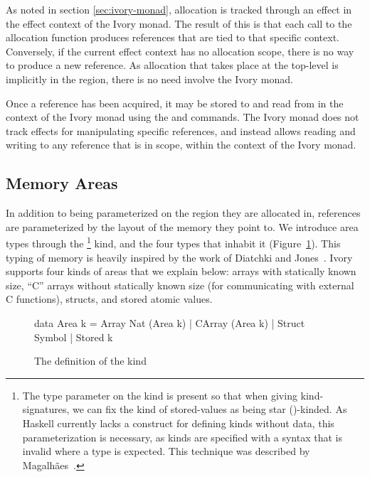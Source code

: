 As noted in section \ref{sec:ivory-monad}, allocation is tracked through an
effect in the effect context of the Ivory monad.  The result of this is that
each call to the  allocation function produces references that are
tied to that specific context.  Conversely, if the current effect context has
no allocation scope, there is no way to produce a new reference.  As allocation
that takes place at the top-level is implicitly in the  region, there
is no need involve the Ivory monad.

Once a reference has been acquired, it may be stored to and read from in the
context of the Ivory monad using the  and  commands.  The
Ivory monad does not track effects for manipulating specific references, and
instead allows reading and writing to any reference that is in scope, within the
context of the Ivory monad.

\subsection{Memory Areas}
\label{sec:area}

In addition to being parameterized on the region they are allocated in,
references are parameterized by the layout of the memory they point to.  We
introduce area types through the  \footnote{ The type parameter on the
 kind is present so that when giving kind-signatures, we can fix the
kind of stored-values as being star (\cd{*})-kinded.  As Haskell currently lacks
a construct for defining kinds without data, this parameterization is necessary,
as kinds are specified with a syntax that is invalid where a type is expected.
This technique was described by Magalh\~{a}es~\cite{jpm:trkgp:12}.} kind, and
the four types that inhabit it (Figure~\ref{fig:area-def}).  This typing of
memory is heavily inspired by the work of Diatchki and Jones~\cite{memareas}.
Ivory supports four kinds of areas that we explain below: arrays with statically
known size, ``C'' arrays without statically known size (for communicating with
external C functions), structs, and stored atomic values.


\begin{figure}[h]
\begin{code}
data Area k = Array Nat (Area k)
            | CArray (Area k)
            | Struct Symbol
            | Stored k
\end{code}
\caption{The definition of the  kind}
\label{fig:area-def}
\end{figure}

